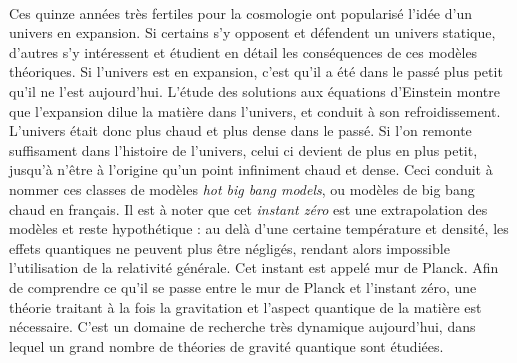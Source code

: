 \documentclass[11pt, twoside, a4paper, openright]{report}
\begin{document}
\paragraph{}
Ces quinze années très fertiles pour la cosmologie ont popularisé l'idée d'un univers en expansion. Si certains s'y opposent et défendent un univers statique, d'autres s'y intéressent et étudient en détail les conséquences de ces modèles théoriques. Si l'univers est en expansion, c'est qu'il a été dans le passé plus petit qu'il ne l'est aujourd'hui. L'étude des solutions aux équations d'Einstein montre que l'expansion dilue la matière dans l'univers, et conduit à son refroidissement. L'univers était donc plus chaud et plus dense dans le passé. Si l'on remonte suffisament dans l'histoire de l'univers, celui ci devient de plus en plus petit, jusqu'à n'être à l'origine qu'un point infiniment chaud et dense. Ceci conduit à nommer ces classes de modèles \emph{hot big bang models}, ou modèles de big bang chaud en français. Il est à noter que cet \emph{instant zéro} est une extrapolation des modèles et reste hypothétique : au delà d'une certaine température et densité, les effets quantiques ne peuvent plus être négligés, rendant alors impossible l'utilisation de la relativité générale. Cet instant est appelé mur de Planck. Afin de comprendre ce qu'il se passe entre le mur de Planck et l'instant zéro, une théorie traitant à la fois la gravitation et l'aspect quantique de la matière est nécessaire. C'est un domaine de recherche très dynamique aujourd'hui, dans lequel un grand nombre de théories de gravité quantique sont étudiées.
\end{document}
